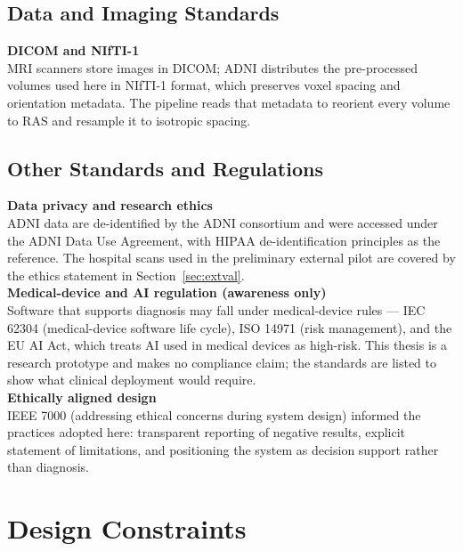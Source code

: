\subsection{Data and Imaging Standards}
\textbf{DICOM and NIfTI-1}\\
MRI scanners store images in DICOM; ADNI distributes the pre-processed volumes used here in NIfTI-1 format, which preserves voxel spacing and orientation metadata. The pipeline reads that metadata to reorient every volume to RAS and resample it to isotropic spacing.

\subsection{Other Standards and Regulations}
\textbf{Data privacy and research ethics}\\
ADNI data are de-identified by the ADNI consortium and were accessed under the ADNI Data Use Agreement, with HIPAA de-identification principles as the reference. The hospital scans used in the preliminary external pilot are covered by the ethics statement in Section~\ref{sec:extval}.\\
\textbf{Medical-device and AI regulation (awareness only)}\\
Software that supports diagnosis may fall under medical-device rules --- IEC 62304 (medical-device software life cycle), ISO 14971 (risk management), and the EU AI Act, which treats AI used in medical devices as high-risk. This thesis is a research prototype and makes no compliance claim; the standards are listed to show what clinical deployment would require.\\
\textbf{Ethically aligned design}\\
IEEE 7000 (addressing ethical concerns during system design) informed the practices adopted here: transparent reporting of negative results, explicit statement of limitations, and positioning the system as decision support rather than diagnosis.

\section{Design Constraints}


